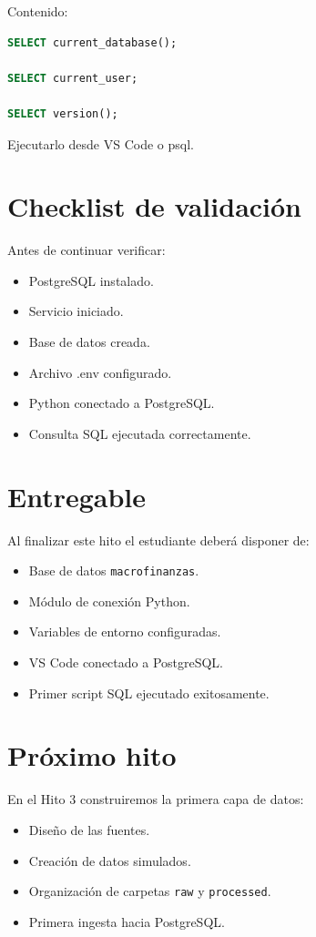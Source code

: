 Contenido:

\begin{lstlisting}[language=SQL]
SELECT current_database();

SELECT current_user;

SELECT version();
\end{lstlisting}

Ejecutarlo desde VS Code o psql.

\section{Checklist de validación}

Antes de continuar verificar:

\begin{itemize}
\item[$\Box$] PostgreSQL instalado.
\item[$\Box$] Servicio iniciado.
\item[$\Box$] Base de datos creada.
\item[$\Box$] Archivo .env configurado.
\item[$\Box$] Python conectado a PostgreSQL.
\item[$\Box$] Consulta SQL ejecutada correctamente.
\end{itemize}

\section{Entregable}

Al finalizar este hito el estudiante deberá disponer de:

\begin{itemize}
\item Base de datos \texttt{macrofinanzas}.
\item Módulo de conexión Python.
\item Variables de entorno configuradas.
\item VS Code conectado a PostgreSQL.
\item Primer script SQL ejecutado exitosamente.
\end{itemize}

\section{Próximo hito}

En el Hito 3 construiremos la primera capa de datos:

\begin{itemize}
\item Diseño de las fuentes.
\item Creación de datos simulados.
\item Organización de carpetas \texttt{raw} y \texttt{processed}.
\item Primera ingesta hacia PostgreSQL.
\end{itemize}
